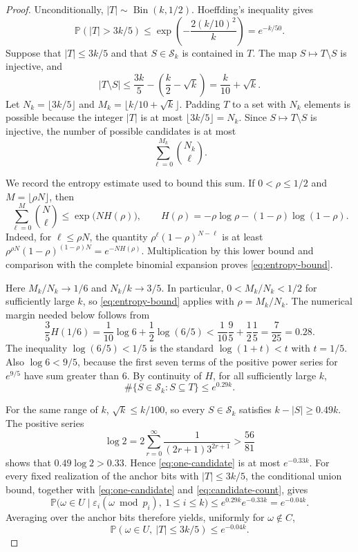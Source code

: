 \documentclass[11pt]{article}
\numberwithin{equation}{section}
\theoremstyle{definition}
\theoremstyle{remark}
\newcommand{\Pp}{\mathbb P}
\newcommand{\cS}{\mathcal S}
\begin{document}
\begin{proof}
Unconditionally, \(|T|\sim\operatorname{Bin}(k,1/2)\).  Hoeffding's
inequality \cite{Hoeffding63} gives
\begin{equation}\label{eq:T-tail}
 \Pp(|T|>3k/5)
 \le\exp\left(-\frac{2(k/10)^2}{k}\right)
 =e^{-k/50}.
\end{equation}
Suppose that \(|T|\le3k/5\) and that \(S\in\cS_k\) is contained in \(T\).
The map \(S\mapsto T\setminus S\) is injective, and
\[
 |T\setminus S|
 \le\frac{3k}{5}-\left(\frac k2-\sqrt k\right)
 =\frac{k}{10}+\sqrt k.
\]
Let \(N_k=\lfloor3k/5\rfloor\) and
\(M_k=\lfloor k/10+\sqrt k\rfloor\).  Padding \(T\) to a set with
\(N_k\) elements is possible because the integer \(|T|\) is at most
\(\lfloor3k/5\rfloor=N_k\).  Since \(S\mapsto T\setminus S\) is
injective, the number of possible candidates is at most
\[
 \sum_{\ell=0}^{M_k}\binom{N_k}{\ell}.
\]

We record the entropy estimate used to bound this sum.  If
\(0<\rho\le1/2\) and \(M=\lfloor\rho N\rfloor\), then
\begin{equation}\label{eq:entropy-bound}
 \sum_{\ell=0}^{M}\binom N\ell
 \le\exp\bigl(NH(\rho)\bigr),
 \qquad
 H(\rho)=-\rho\log\rho-(1-\rho)\log(1-\rho).
\end{equation}
Indeed, for \(\ell\le\rho N\), the quantity
\(\rho^\ell(1-\rho)^{N-\ell}\) is at least
\(\rho^{\rho N}(1-\rho)^{(1-\rho)N}=e^{-NH(\rho)}\).
Multiplication by this lower bound and comparison with the complete
binomial expansion proves \eqref{eq:entropy-bound}.

Here \(M_k/N_k\to1/6\) and \(N_k/k\to3/5\).  In particular,
\(0<M_k/N_k<1/2\) for sufficiently large \(k\), so
\eqref{eq:entropy-bound} applies with \(\rho=M_k/N_k\).  The numerical
margin needed below follows from
\[
 \frac35H(1/6)
 =\frac1{10}\log6+\frac12\log(6/5)
 <\frac1{10}\frac95+\frac12\frac15
 =\frac7{25}=0.28.
\]
The inequality \(\log(6/5)<1/5\) is the standard
\(\log(1+t)<t\) with \(t=1/5\).  Also \(\log6<9/5\), because the first
seven terms of the positive power series for \(e^{9/5}\) have sum greater
than \(6\).  By continuity of \(H\), for all sufficiently large \(k\),
\begin{equation}\label{eq:candidate-count}
 \#\{S\in\cS_k:S\subseteq T\}\le e^{0.29k}.
\end{equation}

For the same range of \(k\), \(\sqrt k\le k/100\), so every
\(S\in\cS_k\) satisfies \(k-|S|\ge0.49k\).  The positive series
\[
 \log2
 =2\sum_{r=0}^{\infty}
   \frac1{(2r+1)3^{2r+1}}
 >\frac{56}{81}
\]
shows that \(0.49\log2>0.33\).  Hence \eqref{eq:one-candidate} is at most
\(e^{-0.33k}\).  For every fixed realization of the anchor bits with
\(|T|\le3k/5\), the conditional union bound, together with
\eqref{eq:one-candidate} and \eqref{eq:candidate-count}, gives
\[
 \Pp\bigl(\omega\in U\mid
   \varepsilon_i(\omega\bmod p_i),\ 1\le i\le k\bigr)
 \le e^{0.29k}e^{-0.33k}=e^{-0.04k}.
\]
Averaging over the anchor bits therefore yields, uniformly for
\(\omega\notin C\),
\[
 \Pp(\omega\in U,\ |T|\le3k/5)\le e^{-0.04k}.
\]


\end{proof}
\end{document}
